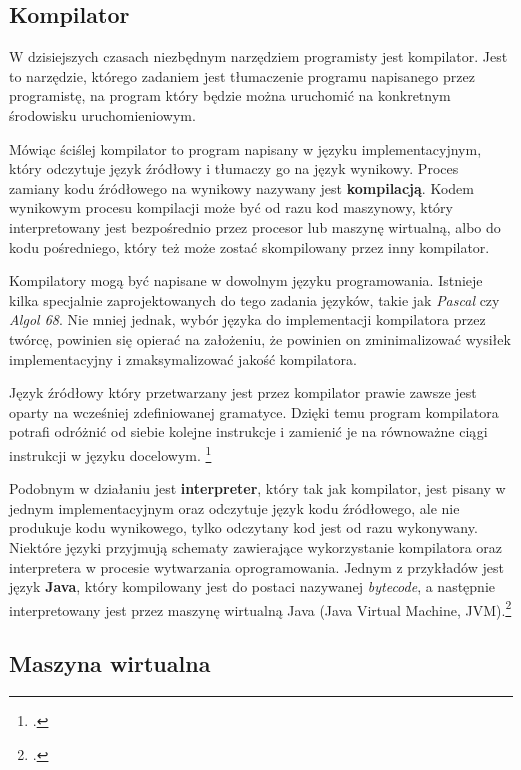 \subsection{Kompilator}
W dzisiejszych czasach niezbędnym narzędziem programisty jest kompilator. Jest to narzędzie, którego zadaniem jest tłumaczenie programu napisanego przez programistę, na program który będzie można uruchomić na konkretnym środowisku uruchomieniowym.
\par Mówiąc ściślej kompilator to program napisany w języku implementacyjnym, który odczytuje język źródłowy i tłumaczy go na język wynikowy. Proces zamiany kodu źródłowego na wynikowy nazywany jest \textbf{kompilacją}. Kodem wynikowym procesu kompilacji może być od razu kod maszynowy, który interpretowany jest bezpośrednio przez procesor lub maszynę wirtualną, albo do kodu pośredniego, który też może zostać skompilowany przez inny kompilator.
\par Kompilatory mogą być napisane w dowolnym języku programowania. Istnieje kilka specjalnie zaprojektowanych do tego zadania języków, takie jak \textit{Pascal} czy \textit{Algol 68}. Nie mniej jednak, wybór języka do implementacji kompilatora przez twórcę, powinien się opierać na założeniu, że powinien on zminimalizować wysiłek implementacyjny i zmaksymalizować jakość kompilatora.
\par Język źródłowy który przetwarzany jest przez kompilator prawie zawsze jest oparty na wcześniej zdefiniowanej gramatyce. Dzięki temu program kompilatora potrafi odróżnić od siebie kolejne instrukcje i zamienić je na równoważne ciągi instrukcji w języku docelowym.
\footcite[1-4]{Mckeeman1974}
\par Podobnym w działaniu jest \textbf{interpreter}, który tak jak kompilator, jest pisany w jednym implementacyjnym oraz odczytuje język kodu źródłowego, ale nie produkuje kodu wynikowego, tylko odczytany kod jest od razu wykonywany. Niektóre języki przyjmują schematy zawierające wykorzystanie kompilatora oraz interpretera w procesie wytwarzania oprogramowania. Jednym z przykładów jest język \textbf{Java}, który kompilowany jest do postaci nazywanej \textit{bytecode}, a następnie interpretowany jest przez maszynę wirtualną Java (Java Virtual Machine, JVM).\footcite[3,4]{EngineeringCompiler}

\subsection{Maszyna wirtualna}

